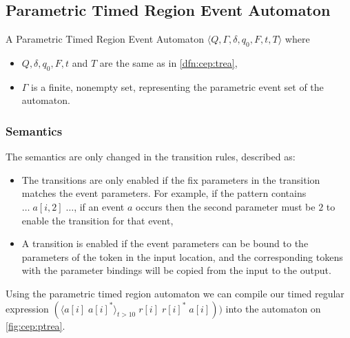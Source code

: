 		\subsection{Parametric Timed Region Event Automaton}
			
			

			\begin{dfn}
				\label{dfn:cep:ptrea}
				A Parametric Timed Region Event Automaton $\langle Q,\Gamma,\delta,q_0, F, t, T \rangle$ where
				\begin{itemize}
					\item $Q, \delta, q_0, F, t$ and  $T$ are the same as in \cref{dfn:cep:trea},
					\item $\Gamma$ is a finite, nonempty set, representing the parametric event set of the automaton.
				\end{itemize}
			\end{dfn}

			\subsubsection{Semantics}
			\label{cep:trea:semantics}

			The semantics are only changed in the transition rules, described as:
			\begin{itemize}
				\item The transitions are only enabled if the fix parameters in the transition matches the event parameters. For example, if the pattern contains $\dots \; a[i,2] \; \dots$, if an event $a$ occurs then the second parameter must be $2$ to enable the transition for that event,
				\item A transition is enabled if the event parameters can be bound to the parameters of the token in the input location, and the corresponding tokens with the parameter bindings will be copied from the input to the output.
			\end{itemize}
	
			Using the parametric timed region automaton we can compile our timed regular expression 
			$(\langle a[i] \;  a[i]^\ast \rangle_{t > 10} \; r[i] \; r[i]^\ast \; a[i]) )$ into the automaton on \cref{fig:cep:ptrea}.
	
